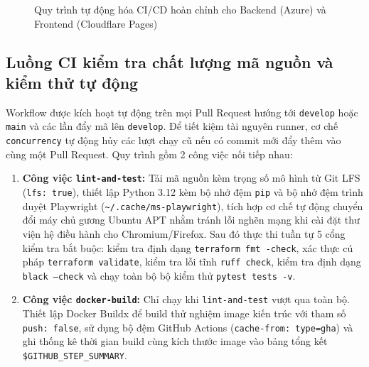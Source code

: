 \begin{figure}[H]
\begin{singlespace}
{%
}
\end{singlespace}
\caption{Quy trình tự động hóa CI/CD hoàn chỉnh cho Backend (Azure) và Frontend (Cloudflare Pages)}
\label{fig:cicd_pipeline}
\end{figure}

\subsection{Luồng CI kiểm tra chất lượng mã nguồn và kiểm thử tự động}
\label{subsec:luong_ci}

Workflow  được kích hoạt tự động trên mọi Pull Request hướng tới \texttt{develop} hoặc \texttt{main} và các lần đẩy mã lên \texttt{develop}. Để tiết kiệm tài nguyên runner, cơ chế \texttt{concurrency} tự động hủy các lượt chạy cũ nếu có commit mới đẩy thêm vào cùng một Pull Request. Quy trình gồm 2 công việc nối tiếp nhau:
\begin{enumerate}
    \item \textbf{Công việc \texttt{lint-and-test}:} Tải mã nguồn kèm trọng số mô hình từ Git LFS (\texttt{lfs: true}), thiết lập Python 3.12 kèm bộ nhớ đệm \texttt{pip} và bộ nhớ đệm trình duyệt Playwright (\texttt{\textasciitilde/.cache/ms-playwright}), tích hợp cơ chế tự động chuyển đổi máy chủ gương Ubuntu APT nhằm tránh lỗi nghẽn mạng khi cài đặt thư viện hệ điều hành cho Chromium/Firefox. Sau đó thực thi tuần tự 5 cổng kiểm tra bắt buộc: kiểm tra định dạng \texttt{terraform fmt -check}, xác thực cú pháp \texttt{terraform validate}, kiểm tra lỗi tĩnh \texttt{ruff check}, kiểm tra định dạng \texttt{black --check} và chạy toàn bộ bộ kiểm thử \texttt{pytest tests -v}.
    \item \textbf{Công việc \texttt{docker-build}:} Chỉ chạy khi \texttt{lint-and-test} vượt qua toàn bộ. Thiết lập Docker Buildx để build thử nghiệm image kiến trúc  với tham số \texttt{push: false}, sử dụng bộ đệm GitHub Actions (\texttt{cache-from: type=gha}) và ghi thống kê thời gian build cùng kích thước image vào bảng tổng kết \texttt{\$GITHUB\_STEP\_SUMMARY}.
\end{enumerate}

